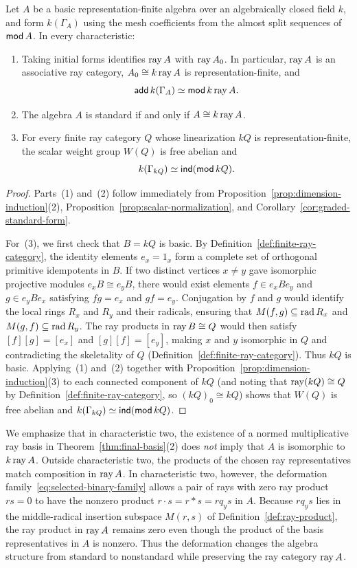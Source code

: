 \begin{theorem}
\label{thm:final-standardness}
Let $A$ be a basic representation-finite algebra over an algebraically closed field $k$, and form $k(\Gamma_A)$ using the mesh coefficients from the almost split sequences of $\operatorname{\mathsf{mod}} A$. In every characteristic:
\begin{enumerate}[label={\upshape(\arabic*)}]
\item Taking initial forms identifies $\operatorname{ray} A$ with $\operatorname{ray} A_0$. In particular, $\operatorname{ray} A$ is an associative ray category, $A_0\cong k\operatorname{ray} A$ is representation-finite, and
\[
  \operatorname{\mathsf{add}} k(\Gamma_A)\simeq\operatorname{\mathsf{mod}} k\operatorname{ray} A.
\]
\item The algebra $A$ is standard if and only if $A\cong k\operatorname{ray} A$.
\item For every finite ray category $Q$ whose linearization $kQ$ is representation-finite, the scalar weight group $W(Q)$ is free abelian and
\[
  k(\Gamma_{kQ})\simeq\operatorname{\mathsf{ind}}(\operatorname{\mathsf{mod}} kQ).
\]
\end{enumerate}
\end{theorem}
\begin{proof}
Parts~(1) and~(2) follow immediately from Proposition~\ref{prop:dimension-induction}(2), Proposition~\ref{prop:scalar-normalization}, and Corollary~\ref{cor:graded-standard-form}.

For~(3), we first check that $B=kQ$ is basic. By Definition~\ref{def:finite-ray-category}, the identity elements $e_x=1_x$ form a complete set of orthogonal primitive idempotents in $B$. If two distinct vertices $x\ne y$ gave isomorphic projective modules $e_xB\cong e_yB$, there would exist elements $f\in e_xBe_y$ and $g\in e_yBe_x$ satisfying $fg=e_x$ and $gf=e_y$. Conjugation by $f$ and $g$ would identify the local rings $R_x$ and $R_y$ and their radicals, ensuring that $M(f,g)\subseteq\operatorname{rad} R_x$ and $M(g,f)\subseteq\operatorname{rad} R_y$. The ray products in $\operatorname{ray} B\cong Q$ would then satisfy $[f][g]=[e_x]$ and $[g][f]=[e_y]$, making $x$ and $y$ isomorphic in $Q$ and contradicting the skeletality of $Q$ (Definition~\ref{def:finite-ray-category}). Thus $kQ$ is basic. Applying~(1) and~(2) together with Proposition~\ref{prop:dimension-induction}(3) to each connected component of $kQ$ (and noting that $\operatorname{ray}(kQ)\cong Q$ by Definition~\ref{def:finite-ray-category}, so $(kQ)_0\cong kQ$) shows that $W(Q)$ is free abelian and $k(\Gamma_{kQ})\simeq\operatorname{\mathsf{ind}}(\operatorname{\mathsf{mod}} kQ)$.
\end{proof}

We emphasize that in characteristic two, the existence of a normed multiplicative ray basis in Theorem~\ref{thm:final-basis}(2) does \emph{not} imply that $A$ is isomorphic to $k\operatorname{ray} A$. Outside characteristic two, the products of the chosen ray representatives match composition in $\operatorname{ray} A$. In characteristic two, however, the deformation family~\eqref{eq:selected-binary-family} allows a pair of rays with zero ray product $rs=0$ to have the nonzero product $r\cdot s=r*s=rq_ys$ in $A$. Because $rq_ys$ lies in the middle-radical insertion subspace $M(r,s)$ of Definition~\ref{def:ray-product}, the ray product in $\operatorname{ray} A$ remains zero even though the product of the basis representatives in $A$ is nonzero. Thus the deformation changes the algebra structure from standard to nonstandard while preserving the ray category $\operatorname{ray} A$.
